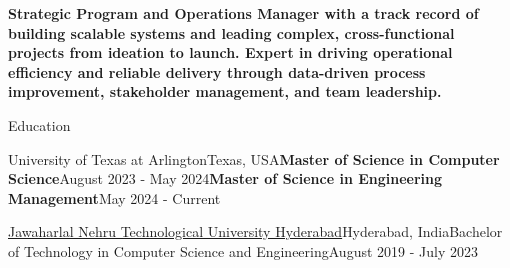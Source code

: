 \documentclass{resume} %
\begin{document}
\textbf{Strategic Program and Operations Manager with a track record of building scalable systems and leading complex, cross-functional projects from ideation to launch. Expert in driving operational efficiency and reliable delivery through data-driven process improvement, stakeholder management, and team leadership.}


\begin{rSection}{Education \vspace{.2em}}
\begin{rSubsection}{University of Texas at Arlington}{Texas, USA}{\textbf{Master of Science in Computer Science}}{August 2023 - May 2024}{\textbf{Master of Science in Engineering Management}}\hfill{May 2024 - Current}
\end{rSubsection}

\begin{rSubsection}{\href{https://www.jntuh.ac.in/}{Jawaharlal Nehru Technological University Hyderabad}}{Hyderabad, India}{Bachelor of Technology in Computer Science and Engineering}{August 2019 - July 2023}
\item[]
\end{rSubsection}
\vspace{0.2 em}
\end{rSection}

\end{document}
